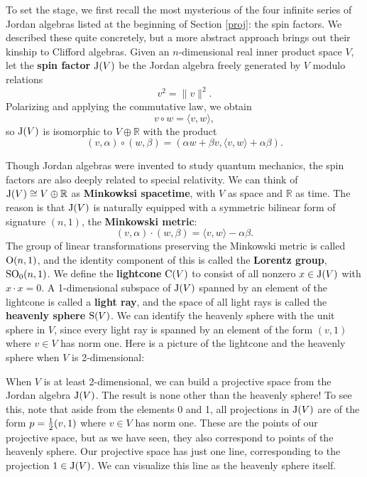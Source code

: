 \documentclass[12pt]{article}
\newcommand\R{{\mathbb R}}
\newcommand{\J}{{\rm J}}
\newcommand{\OO}{{\rm O}}
\newcommand{\SO}{{\rm SO}}
\newcommand{\iso}{\cong}
\begin{document}
To set the stage, we first recall the most mysterious of the four 
infinite series of Jordan algebras listed at the beginning of Section 
\ref{proj}: the spin factors.  We described these quite concretely, but 
a more abstract approach brings out their kinship to Clifford algebras.  
Given an $n$-dimensional real inner product space $V$, let the {\bf spin 
factor} $\J(V)$ be the Jordan algebra freely generated by $V$ modulo
relations  
\[     v^2 = \|v\|^2  .\]  
Polarizing and applying the commutative law, we obtain   
\[   v\circ w = \langle v, w \rangle, \]  
so $\J(V)$ is isomorphic to $V \oplus \R$ with the product  
\[  (v,\alpha) \circ (w, \beta) =   
(\alpha w + \beta v, \langle v,w\rangle + \alpha \beta). \] 
 
Though Jordan algebras were invented to study quantum mechanics, the 
spin factors are also deeply related to special relativity.  We can 
think of $\J(V) \iso V \oplus \R$ as {\bf Minkowksi spacetime}, with 
$V$ as space and $\R$ as time.  The reason is that $\J(V)$ is naturally
equipped with a symmetric bilinear form of signature $(n,1)$, the {\bf
Minkowski metric}: 
\[    (v,\alpha)\cdot (w,\beta) = \langle v,w\rangle - \alpha \beta. \] 
The group of linear transformations preserving the Minkowski metric is 
called $\OO(n,1)$, and the identity component of this is called the {\bf 
Lorentz group}, $\SO_0(n,1)$.   We define the {\bf lightcone} ${\rm 
C}(V)$ to consist of all nonzero $x \in \J(V)$ with $x \cdot x = 0$.  A 
1-dimensional subspace of $\J(V)$ spanned by an element of the 
lightcone is called a {\bf light ray}, and the space of all light rays is 
called the {\bf heavenly sphere} ${\rm S}(V)$.  We can identify the 
heavenly sphere with the unit sphere in $V$, since every light ray is 
spanned by an element of the form $(v,1)$ where $v \in V$ has norm one. 
Here is a picture of the lightcone and the heavenly sphere when $V$ is 
2-dimensional: 
 
\medskip 
\centerline{\epsfysize=1.5in}   
\label{heavenly}   
\medskip 
 
When $V$ is at least 2-dimensional, we can build a projective space from 
the Jordan algebra $\J(V)$.  The result is none other than the heavenly 
sphere!   To see this, note that aside from the elements 0 and 1, all 
projections in $\J(V)$ are of the form $p = \textstyle{1\over 2}(v, 1)$ 
where $v \in V$ has norm one.  These are the points of our projective 
space, but as we have seen, they also correspond to points of the 
heavenly sphere.  Our projective space has just one line, corresponding 
to the projection $1 \in \J(V)$.  We can visualize this line as the 
heavenly sphere itself.  
 
\end{document}
